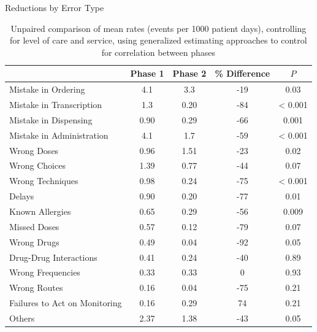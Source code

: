 \documentclass[10pt]{beamer}
\begin{document}
\begin{frame}{Reductions by Error Type}
	\begin{table}
		\scriptsize
		\begin{tabular}{l c c c c}
			& Phase 1 & Phase 2 & \% Difference & $P$  \\ \hline \hline
			Mistake in Ordering & 4.1 & 3.3 & -19 & 0.03 \\
			Mistake in Transcription & 1.3 & 0.20 & -84 & < 0.001 \\
			Mistake in Dispensing & 0.90 & 0.29 & -66 & 0.001 \\
			Mistake in Administration & 4.1 & 1.7 & -59 & < 0.001 \\ \hline
			Wrong Doses & 0.96 & 1.51 & -23 & 0.02 \\
			Wrong Choices & 1.39 & 0.77 & -44 & 0.07 \\
			Wrong Techniques & 0.98 & 0.24 & -75 & < 0.001 \\
			Delays & 0.90 & 0.20 & -77 & 0.01 \\
			Known Allergies & 0.65 & 0.29 & -56 & 0.009 \\
			Missed Doses & 0.57 & 0.12 & -79 & 0.07 \\			
			Wrong Drugs & 0.49 & 0.04 & -92 & 0.05 \\
			Drug-Drug Interactions & 0.41 & 0.24 & -40 & 0.89 \\
			Wrong Frequencies & 0.33 & 0.33 & 0 & 0.93 \\
			Wrong Routes & 0.16 & 0.04 & -75 & 0.21 \\
			Failures to Act on Monitoring & 0.16 & 0.29 & 74 & 0.21 \\
			Others & 2.37 & 1.38 & -43 & 0.05 \\
		\end{tabular}
		\caption*{Unpaired comparison of mean rates (events per 1000 patient days), controlling for level of care and service, using generalized estimating approaches to control for correlation between phases}
	\end{table}
\end{frame}

%	
\end{document}
